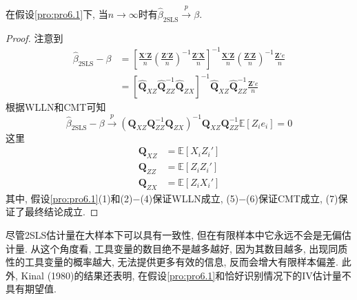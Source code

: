 \documentclass[cn, 12pt, math=mtpro2, bibstyle=apa, blue, twocol]{elegantbook}
\newcommand{\E}{\mathbb{E}}
\newcommand{\Q}{\mathbold{Q}}
\newcommand{\X}{\mathbold{X}}
\newcommand{\Z}{\mathbold{Z}}
\newcommand{\hb}{\hat{\beta}}
\begin{document}
\begin{theorem}
  在假设\ref{pro:pro6.1}下, 当$n\to\infty$时有$\hb_{\text{2SLS}}\xrightarrow{p}\beta$.
\end{theorem}
\begin{proof}
  注意到
  \begin{align*}
  \hb_{\text{2SLS}}-\beta&=\left[\frac{\X'\Z}{n}\left(\frac{\Z'\Z}{n}\right)^{-1}\frac{\Z'\X}{n}\right]^{-1}\frac{\X'\Z}{n}\left(\frac{\Z'\Z}{n}\right)^{-1}\frac{\Z'e}{n} \\
  &=[\hat{\Q}_{XZ}\hat{\Q}_{ZZ}^{-1}\hat{\Q}_{ZX}]^{-1}\hat{\Q}_{XZ}\hat{\Q}_{ZZ}^{-1}\frac{\Z'e}{n}
  \end{align*}
  根据WLLN和CMT可知
  $$\hb_{\text{2SLS}}-\beta\xrightarrow{p}(\Q_{XZ}\Q_{ZZ}^{-1}\Q_{ZX})^{-1}\Q_{XZ}\Q_{ZZ}^{-1}\E[Z_ie_i]=0$$
  这里
  \begin{align*}
  \Q_{XZ}&=\E[X_iZ_i'] \\
  \Q_{ZZ}&=\E[Z_iZ_i'] \\
  \Q_{ZX}&=\E[Z_iX_i']
  \end{align*}
  其中, 假设\ref{pro:pro6.1}(1)和(2)$-$(4)保证WLLN成立, (5)$-$(6)保证CMT成立, (7)保证了最终结论成立.

\end{proof}
\begin{remark}
尽管2SLS估计量在大样本下可以具有一致性, 但在有限样本中它永远不会是无偏估计量. 从这个角度看, 工具变量的数目绝不是越多越好, 因为其数目越多, 出现同质性的工具变量的概率越大, 无法提供更多有效的信息, 反而会增大有限样本偏差. 此外, Kinal (1980)的结果还表明, 在假设\ref{pro:pro6.1}和恰好识别情况下的IV估计量不具有期望值.
\end{remark}
\end{document}
